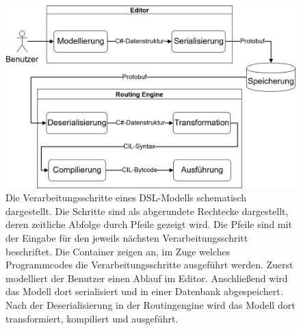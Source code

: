 \begin{figure} %
	\centering
		\includegraphics[width=\textwidth]{img/Verarbeitungsschritte.png}
	\caption[Verarbeitungsschritte eines DSL-Modells]{Die Verarbeitungsschritte eines DSL-Modells schematisch dargestellt. Die Schritte sind als abgerundete Rechtecke dargestellt, deren zeitliche Abfolge durch Pfeile gezeigt wird. Die Pfeile sind mit der Eingabe für den jeweils nächsten Verarbeitungsschritt beschriftet. Die Container zeigen an, im Zuge welches Programmcodes die Verarbeitungsschritte ausgeführt werden. Zuerst modelliert der Benutzer einen Ablauf im Editor. Anschließend wird das Modell dort serialisiert und in einer Datenbank abgespeichert. Nach der Deserialisierung in der Routingengine wird das Modell dort transformiert, kompiliert und ausgeführt.}
	\label{fig:Verarbeitungsschritte}
\end{figure}
